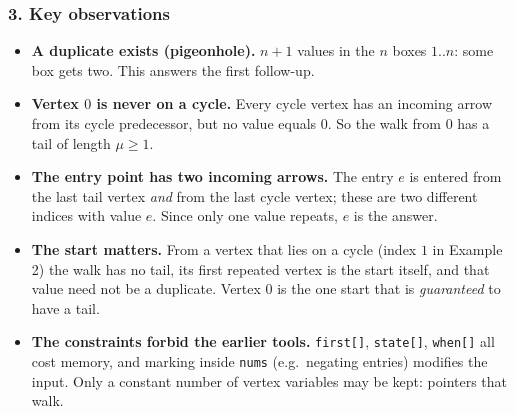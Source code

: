 \subsubsection*{3. Key observations}

\begin{itemize}[leftmargin=*]
    \item \textbf{A duplicate exists (pigeonhole).} $n+1$ values in the $n$ boxes $1..n$: some box gets two. This answers the first follow-up.
    \item \textbf{Vertex $0$ is never on a cycle.} Every cycle vertex has an incoming arrow from its cycle predecessor, but no value equals $0$. So the walk from $0$ has a tail of length $\mu \ge 1$.
    \item \textbf{The entry point has two incoming arrows.} The entry $e$ is entered from the last tail vertex \emph{and} from the last cycle vertex; these are two different indices with value $e$. Since only one value repeats, $e$ is the answer.
    \item \textbf{The start matters.} From a vertex that lies on a cycle (index $1$ in Example 2) the walk has no tail, its first repeated vertex is the start itself, and that value need not be a duplicate. Vertex $0$ is the one start that is \emph{guaranteed} to have a tail.
    \item \textbf{The constraints forbid the earlier tools.} \texttt{first[]}, \texttt{state[]}, \texttt{when[]} all cost  memory, and marking inside \texttt{nums} (e.g.\ negating entries) modifies the input. Only a constant number of vertex variables may be kept: pointers that walk.
\end{itemize}

\begin{diagrambox}
\end{diagrambox}

